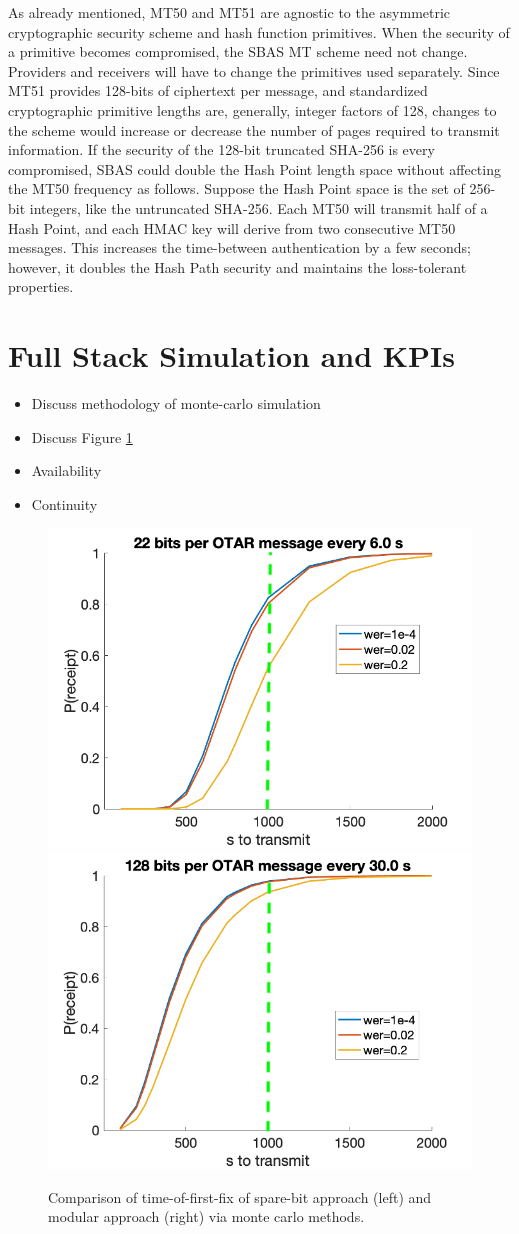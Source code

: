\documentclass[letterpaper,times]{IONconf/IONconf}
\begin{document}
As already mentioned, MT50 and MT51 are agnostic to the asymmetric cryptographic security scheme and hash function primitives.
When the security of a primitive becomes compromised, the SBAS MT scheme need not change.
Providers and receivers will have to change the primitives used separately.
Since MT51 provides 128-bits of ciphertext per message, and standardized cryptographic primitive lengths are, generally, integer factors of 128, changes to the scheme would increase or decrease the number of pages required to transmit information.
If the security of the 128-bit truncated SHA-256 is every compromised, SBAS could double the Hash Point length space without affecting the MT50 frequency as follows.
Suppose the Hash Point space is the set of 256-bit integers, like the untruncated SHA-256.
Each MT50 will transmit half of a Hash Point, and each HMAC key will derive from two consecutive MT50 messages.
This increases the time-between authentication by a few seconds; however, it doubles the Hash Path security and maintains the loss-tolerant properties.

\pagebreak

\section{Full Stack Simulation and KPIs}

\begin{itemize}
	\item Discuss methodology of monte-carlo simulation
	\item Discuss Figure \ref{fig:time-of-first-fix-mc}
	\item Availability
	\item Continuity
\end{itemize}

\begin{figure}[H]
	\centering
	\includegraphics[width=0.4\linewidth]{fig/integrated_mc.png}
	\includegraphics[width=0.4\linewidth]{fig/modular_mc.png}
	\caption{Comparison of time-of-first-fix of spare-bit approach (left) and modular approach (right) via monte carlo methods.}
	\label{fig:time-of-first-fix-mc}
\end{figure}
\end{document}
